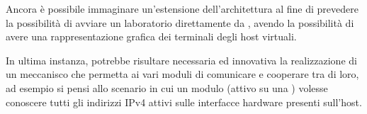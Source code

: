 Ancora è possibile immaginare un'estensione dell'architettura al fine di prevedere la possibilità di avviare un laboratorio direttamente da \visualnetkit{}, avendo la possibilità di avere una rappresentazione grafica dei terminali degli host virtuali.

In ultima instanza, potrebbe risultare necessaria ed innovativa la realizzazione di un meccanisco che permetta ai vari moduli di comunicare e cooperare tra di loro, ad esempio si pensi allo scenario in cui un modulo (attivo su una \virtualmachine) volesse conoscere tutti gli indirizzi IPv4 attivi sulle interfacce hardware presenti sull'host.
